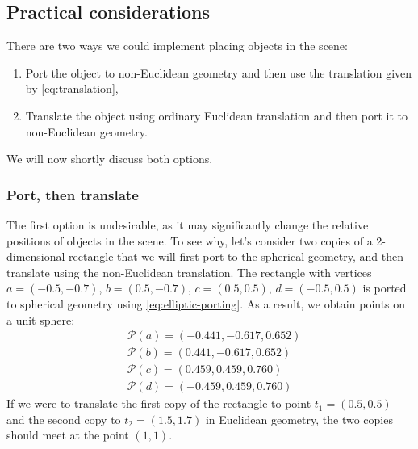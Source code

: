 \subsection{Practical considerations} %
There are two ways we could implement placing objects in the scene:
\begin{enumerate}
    \item Port the object to non-Euclidean geometry and then use the translation given by \autoref{eq:translation},
    \item Translate the object using ordinary Euclidean translation and then port it to non-Euclidean geometry.
\end{enumerate}
We will now shortly discuss both options.

\subsubsection*{Port, then translate}
The first option is undesirable, as it may significantly change the relative positions of objects in the scene.
To see why, let's consider two copies of a 2-dimensional rectangle that we will first port to the spherical geometry, and then translate using the non-Euclidean translation.
The rectangle with vertices $a = (-0.5, -0.7)$, $b = (0.5, -0.7)$, $c = (0.5, 0.5)$, $d = (-0.5, 0.5)$ is ported to spherical geometry using \autoref{eq:elliptic-porting}.
As a result, we obtain points on a unit sphere:
\begin{equation*}
    \begin{split}
         & \mathcal{P}(a) = (-0.441, -0.617, 0.652) \\
         & \mathcal{P}(b) = (0.441, -0.617, 0.652)  \\
         & \mathcal{P}(c) = (0.459, 0.459, 0.760)   \\
         & \mathcal{P}(d) = (-0.459, 0.459, 0.760)
    \end{split}
\end{equation*}
If we were to translate the first copy of the rectangle to point $t_1 = (0.5, 0.5)$ and the second copy to $t _2 = (1.5, 1.7)$ in Euclidean geometry, the two copies should meet at the point $(1, 1)$.


